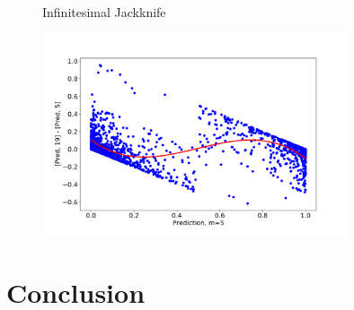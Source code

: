 \documentclass[11pt]{article}
\begin{document}
\begin{figure}[htbp]
\begin{minipage}{0.6\textwidth}
	\caption{Infinitesimal Jackknife}
	\end{minipage}
\end{figure}

\begin{figure}[htbp]
	\label{fig:figure_4_2}
	\centering
	\includegraphics[width=0.8\textwidth]{../figures/figure4(2).pdf}
\end{figure}

\section{Conclusion}

\end{document}
